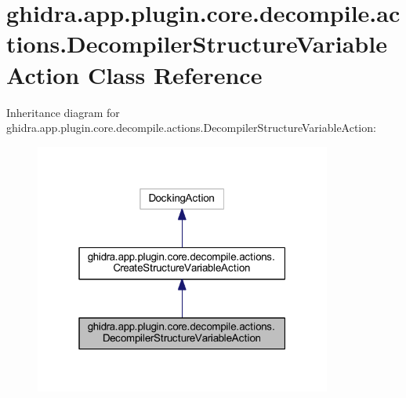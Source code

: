 \hypertarget{classghidra_1_1app_1_1plugin_1_1core_1_1decompile_1_1actions_1_1_decompiler_structure_variable_action}{}\section{ghidra.\+app.\+plugin.\+core.\+decompile.\+actions.\+Decompiler\+Structure\+Variable\+Action Class Reference}
\label{classghidra_1_1app_1_1plugin_1_1core_1_1decompile_1_1actions_1_1_decompiler_structure_variable_action}


Inheritance diagram for ghidra.\+app.\+plugin.\+core.\+decompile.\+actions.\+Decompiler\+Structure\+Variable\+Action\+:
\nopagebreak
\begin{figure}[H]
\begin{center}
\leavevmode
\includegraphics[width=277pt]{classghidra_1_1app_1_1plugin_1_1core_1_1decompile_1_1actions_1_1_decompiler_structure_variable_action__inherit__graph}
\end{center}
\end{figure}


